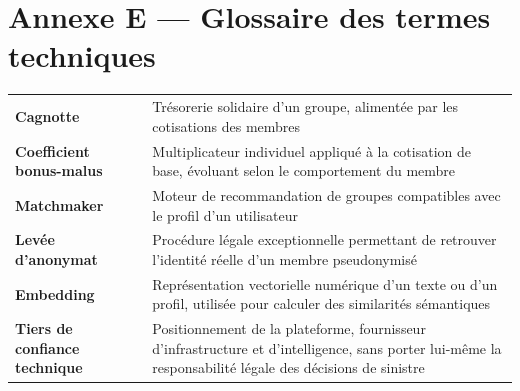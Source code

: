 \documentclass[12pt,a4paper]{report}
\begin{document}
\section*{Annexe E — Glossaire des termes techniques}
\begin{longtable}{p{4cm}p{9.5cm}}
\toprule
\textbf{Cagnotte} & Trésorerie solidaire d'un groupe, alimentée par les cotisations des membres \\
\textbf{Coefficient bonus-malus} & Multiplicateur individuel appliqué à la cotisation de base, évoluant selon le comportement du membre \\
\textbf{Matchmaker} & Moteur de recommandation de groupes compatibles avec le profil d'un utilisateur \\
\textbf{Levée d'anonymat} & Procédure légale exceptionnelle permettant de retrouver l'identité réelle d'un membre pseudonymisé \\
\textbf{Embedding} & Représentation vectorielle numérique d'un texte ou d'un profil, utilisée pour calculer des similarités sémantiques \\
\textbf{Tiers de confiance technique} & Positionnement de la plateforme, fournisseur d'infrastructure et d'intelligence, sans porter lui-même la responsabilité légale des décisions de sinistre \\
\bottomrule
\end{longtable}
\end{document}
